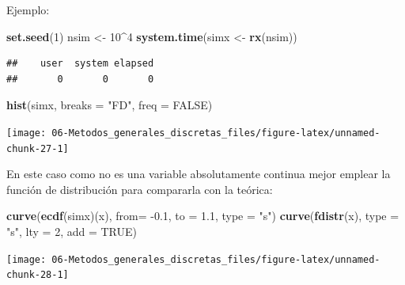 \documentclass[
]{book}
\newenvironment{Shaded}{\begin{snugshade}}{\end{snugshade}}
\newcommand{\DataTypeTok}[1]{\textcolor[rgb]{0.13,0.29,0.53}{#1}}
\newcommand{\DecValTok}[1]{\textcolor[rgb]{0.00,0.00,0.81}{#1}}
\newcommand{\FloatTok}[1]{\textcolor[rgb]{0.00,0.00,0.81}{#1}}
\newcommand{\KeywordTok}[1]{\textcolor[rgb]{0.13,0.29,0.53}{\textbf{#1}}}
\newcommand{\NormalTok}[1]{#1}
\newcommand{\OperatorTok}[1]{\textcolor[rgb]{0.81,0.36,0.00}{\textbf{#1}}}
\newcommand{\OtherTok}[1]{\textcolor[rgb]{0.56,0.35,0.01}{#1}}
\newcommand{\StringTok}[1]{\textcolor[rgb]{0.31,0.60,0.02}{#1}}
\theoremstyle{break}
\theoremstyle{definition}
\theoremstyle{definition}
\theoremstyle{definition}
\theoremstyle{remark}
\let\BeginKnitrBlock\begin \let\EndKnitrBlock\end
\begin{document}
\begin{enumerate}
  Ejemplo:

\begin{Shaded}
\begin{Highlighting}[]
\KeywordTok{set.seed}\NormalTok{(}\DecValTok{1}\NormalTok{)}
\NormalTok{nsim <-}\StringTok{ }\DecValTok{10}\OperatorTok{^}\DecValTok{4}
\KeywordTok{system.time}\NormalTok{(simx <-}\StringTok{ }\KeywordTok{rx}\NormalTok{(nsim))}
\end{Highlighting}
\end{Shaded}

\begin{verbatim}
##    user  system elapsed 
##       0       0       0
\end{verbatim}

\begin{Shaded}
\begin{Highlighting}[]
\KeywordTok{hist}\NormalTok{(simx, }\DataTypeTok{breaks =} \StringTok{"FD"}\NormalTok{, }\DataTypeTok{freq =} \OtherTok{FALSE}\NormalTok{)}
\end{Highlighting}
\end{Shaded}

  \begin{center}\texttt{[image: 06-Metodos\_generales\_discretas\_files/figure-latex/unnamed-chunk-27-1]} \end{center}

  En este caso como no es una variable absolutamente continua mejor emplear
  la función de distribución para compararla con la teórica:

\begin{Shaded}
\begin{Highlighting}[]
\KeywordTok{curve}\NormalTok{(}\KeywordTok{ecdf}\NormalTok{(simx)(x), }\DataTypeTok{from=} \FloatTok{-0.1}\NormalTok{, }\DataTypeTok{to =} \FloatTok{1.1}\NormalTok{, }\DataTypeTok{type =} \StringTok{"s"}\NormalTok{)}
\KeywordTok{curve}\NormalTok{(}\KeywordTok{fdistr}\NormalTok{(x), }\DataTypeTok{type =} \StringTok{"s"}\NormalTok{, }\DataTypeTok{lty =} \DecValTok{2}\NormalTok{, }\DataTypeTok{add =} \OtherTok{TRUE}\NormalTok{)}
\end{Highlighting}
\end{Shaded}

  \begin{center}\texttt{[image: 06-Metodos\_generales\_discretas\_files/figure-latex/unnamed-chunk-28-1]} \end{center}
\end{enumerate}

\BeginKnitrBlock{exercise}[propuesto]
\protect\hypertarget{exr:hipergeom}{}{\label{exr:hipergeom} {} }
\EndKnitrBlock{exercise}
\end{document}
